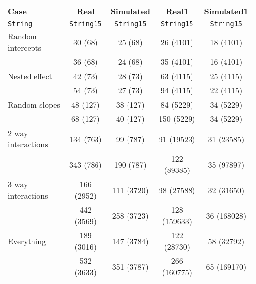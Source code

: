 \begin{tabular}{lcccc}
  \textbf{Case} & \textbf{Real} & \textbf{Simulated} & \textbf{Real1} & \textbf{Simulated1} \\
  \texttt{String} & \texttt{String15} & \texttt{String15} & \texttt{String15} & \texttt{String15} \\
  Random intercepts & 30 (68) & 25 (68) & 26 (4101) & 18 (4101) \\
   & 36 (68) & 24 (68) & 35 (4101) & 16 (4101) \\\hline
  Nested effect & 42 (73) & 28 (73) & 63 (4115) & 25 (4115) \\
   & 54 (73) & 27 (73) & 94 (4115) & 22 (4115) \\\hline
  Random slopes & 48 (127) & 38 (127) & 84 (5229) & 34 (5229) \\
   & 68 (127) & 40 (127) & 150 (5229) & 34 (5229) \\\hline
  2 way interactions & 134 (763) & 99 (787) & 91 (19523) & 31 (23585) \\
   & 343 (786) & 190 (787) & 122 (89385) & 35 (97897) \\\hline
  3 way interactions & 166 (2952) & 111 (3720) & 98 (27588) & 32 (31650) \\
   & 442 (3569) & 258 (3723) & 128 (159633) & 36 (168028) \\\hline
  Everything & 189 (3016) & 147 (3784) & 122 (28730) & 58 (32792) \\
   & 532 (3633) & 351 (3787) & 266 (160775) & 65 (169170) \\
\end{tabular}
